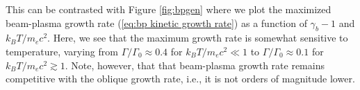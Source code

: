 \documentclass[usenatbib,iop,apj]{emulateapj}
\newcommand\bmath[1] {\mbox{\boldmath$\rm #1$}}
\newcommand{\kvec}{\ensuremath{\bmath{k}}}
\begin{document}
This can be contrasted with Figure \ref{fig:bpgen} where we plot the maximized beam-plasma growth rate  (\ref{eq:bp kinetic growth rate}) as a function of $\gamma_b - 1$ and $k_B T/m_ec^2$.   Here, we see that the maximum growth rate is somewhat sensitive to temperature, varying from $\Gamma/\Gamma_0 \approx 0.4$ for $k_BT/m_ec^2 \ll 1$ to $\Gamma/\Gamma_0 \approx 0.1$ for $k_BT/m_ec^2 \gtrsim 1$.  Note, however, that that beam-plasma growth rate remains competitive with the oblique growth rate, i.e., it is not orders of magnitude lower.  




% 
% 
\end{document}
